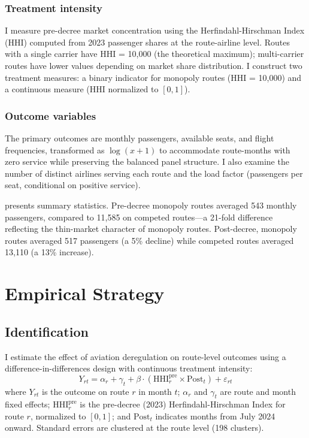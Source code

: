 \documentclass[12pt]{article}
\begin{document}
\subsubsection*{Treatment intensity} I measure pre-decree market concentration using the Herfindahl-Hirschman Index (HHI) computed from 2023 passenger shares at the route-airline level. Routes with a single carrier have HHI = 10,000 (the theoretical maximum); multi-carrier routes have lower values depending on market share distribution. I construct two treatment measures: a binary indicator for monopoly routes (HHI = 10,000) and a continuous measure (HHI normalized to $[0,1]$).

\subsubsection*{Outcome variables} The primary outcomes are monthly passengers, available seats, and flight frequencies, transformed as $\log(x + 1)$ to accommodate route-months with zero service while preserving the balanced panel structure. I also examine the number of distinct airlines serving each route and the load factor (passengers per seat, conditional on positive service).

 presents summary statistics. Pre-decree monopoly routes averaged 543 monthly passengers, compared to 11,585 on competed routes---a 21-fold difference reflecting the thin-market character of monopoly routes. Post-decree, monopoly routes averaged 517 passengers (a 5\% decline) while competed routes averaged 13,110 (a 13\% increase).




\section{Empirical Strategy}

\subsection{Identification}

I estimate the effect of aviation deregulation on route-level outcomes using a difference-in-differences design with continuous treatment intensity:
\begin{equation}
Y_{rt} = \alpha_r + \gamma_t + \beta \cdot \left(\text{HHI}_r^{\text{pre}} \times \text{Post}_t\right) + \varepsilon_{rt}
\label{eq:main}
\end{equation}
where $Y_{rt}$ is the outcome on route $r$ in month $t$; $\alpha_r$ and $\gamma_t$ are route and month fixed effects; $\text{HHI}_r^{\text{pre}}$ is the pre-decree (2023) Herfindahl-Hirschman Index for route $r$, normalized to $[0,1]$; and $\text{Post}_t$ indicates months from July 2024 onward. Standard errors are clustered at the route level (198 clusters).
\end{document}
